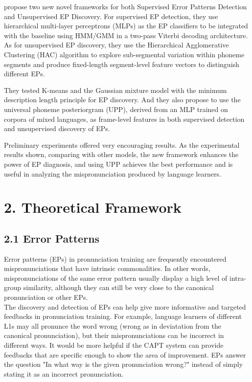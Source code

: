 \documentclass[nobib]{tufte-handout}
\begin{document}
\cite{wang2015supervised} propose two new novel frameworks for both Supervised Error Patterns Detection and Unsupervised EP Discovery.  For supervised EP detection,  they use hierarchical multi-layer perceptrons (MLPs) as the EP classifiers to be integrated with the baseline using HMM/GMM in a two-pass Viterbi decoding architecture.  As for unsupervised EP discovery, they  use the Hierarchical Agglomerative Clustering (HAC) algorithm to explore sub-segmental variation within phoneme segments and produce fixed-length segment-level feature vectors to distinguish different EPs. 

They tested K-means  and the Gaussian mixture model with the minimum description length principle  for EP discovery.  And they also propose to use the universal phoneme posteriorgram (UPP), derived from an MLP trained on corpora of mixed languages, as frame-level features in both supervised detection and unsupervised discovery of EPs. 

Preliminary experiments offered very encouraging results.  As the experimental results shown, comparing with other models, the new framework enhances the power of EP diagnosis, and using UPP achieves the best performance and is useful in analyzing the mispronunciation produced by language learners.





\bigskip
\section{2. \textbf{Theoretical Framework}}
\subsection{2.1 \textbf{Error Patterns}}

\noindent Error patterns (EPs) in pronunciation training are frequently encountered mispronunciations that have intrinsic commonalities. In other words, mispronunciations of the same error pattern usually display a high level of intra-group similarity, although they can still be very close to the canonical pronunciation or other EPs.\\

\noindent The discovery and detection of EPs can help give more informative and targeted feedbacks in pronunciation training. For example, language learners of different L1s may all pronunce the word wrong (wrong as in deviatation from the canonical pronunciation), but their mispronunciations can be incorrect in different ways. It would be more helpful if the CAPT system can provide feedbacks that are specific enough to show the area of improvement. EPs answer the question "In what way is the given pronunciation wrong?" instead of simply stating it as an incorrect pronunciation.
\end{document}
